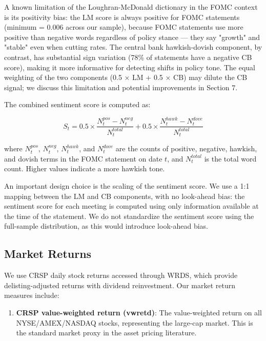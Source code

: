 \documentclass[12pt]{article}
\begin{document}
A known limitation of the Loughran-McDonald dictionary in the FOMC context is its positivity bias: the LM score is always positive for FOMC statements (minimum = 0.006 across our sample), because FOMC statements use more positive than negative words regardless of policy stance --- they say "growth" and "stable" even when cutting rates. The central bank hawkish-dovish component, by contrast, has substantial sign variation (78\% of statements have a negative CB score), making it more informative for detecting shifts in policy tone. The equal weighting of the two components (0.5 × LM + 0.5 × CB) may dilute the CB signal; we discuss this limitation and potential improvements in Section 7.

The combined sentiment score is computed as:

\begin{equation*}
S_t = 0.5 \times \frac{N^{pos}_t - N^{neg}_t}{N^{total}_t} + 0.5 \times \frac{N^{hawk}_t - N^{dove}_t}{N^{total}_t}
\end{equation*}

where $N^{pos}_t$, $N^{neg}_t$, $N^{hawk}_t$, and $N^{dove}_t$ are the counts of positive, negative, hawkish, and dovish terms in the FOMC statement on date $t$, and $N^{total}_t$ is the total word count. Higher values indicate a more hawkish tone.

An important design choice is the scaling of the sentiment score. We use a 1:1 mapping between the LM and CB components, with no look-ahead bias: the sentiment score for each meeting is computed using only information available at the time of the statement. We do not standardize the sentiment score using the full-sample distribution, as this would introduce look-ahead bias.

\subsection{Market Returns}

We use CRSP daily stock returns accessed through WRDS, which provide delisting-adjusted returns with dividend reinvestment. Our market return measures include:

\begin{enumerate}
\item \textbf{CRSP value-weighted return (vwretd)}: The value-weighted return on all NYSE/AMEX/NASDAQ stocks, representing the large-cap market. This is the standard market proxy in the asset pricing literature.
\end{enumerate}
\end{document}
